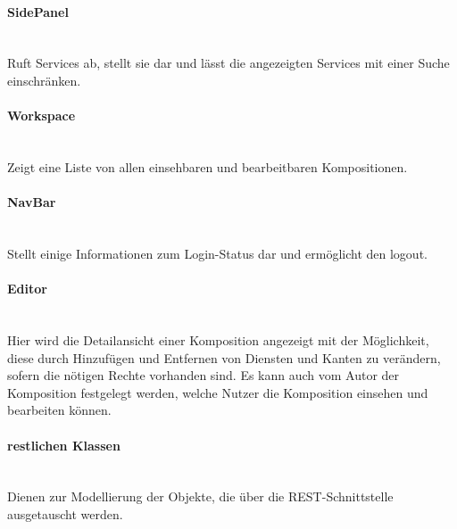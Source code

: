 \paragraph{SidePanel}\mbox{}\\
Ruft Services ab, stellt sie dar und lässt die angezeigten Services mit einer Suche einschränken. 
\paragraph{Workspace}\mbox{}\\
Zeigt eine Liste von allen einsehbaren und bearbeitbaren Kompositionen. 
\paragraph{NavBar}\mbox{}\\
Stellt einige Informationen zum Login-Status dar und ermöglicht den logout.
\paragraph{Editor}\mbox{}\\
Hier wird die Detailansicht einer Komposition angezeigt mit der Möglichkeit, diese durch Hinzufügen und Entfernen von
Diensten und Kanten zu verändern, sofern die nötigen Rechte vorhanden sind. Es kann auch vom Autor der Komposition festgelegt
werden, welche Nutzer die Komposition einsehen und bearbeiten können. 
\paragraph{restlichen Klassen}\mbox{}\\
Dienen zur Modellierung der Objekte, die über die REST-Schnittstelle ausgetauscht werden. 
